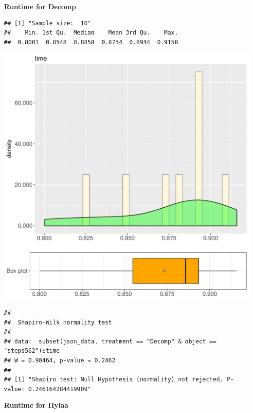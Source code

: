 \documentclass{article}\usepackage[]{graphicx}\usepackage[]{color}
\makeatletter
\def\maxwidth{ %
  \ifdim\Gin@nat@width>\linewidth
    \linewidth
  \else
    \Gin@nat@width
  \fi
}
\newenvironment{kframe}{%
 \def\at@end@of@kframe{}%
 \ifinner\ifhmode%
  \def\at@end@of@kframe{\end{minipage}}%
  \begin{minipage}{\columnwidth}%
 \fi\fi%
 \def\FrameCommand##1{\hskip\@totalleftmargin \hskip-\fboxsep
 \colorbox{shadecolor}{##1}\hskip-\fboxsep
     \hskip-\linewidth \hskip-\@totalleftmargin \hskip\columnwidth}%
 \MakeFramed {\advance\hsize-\width
   \@totalleftmargin\z@ \linewidth\hsize
   \@setminipage}}%
 {\par\unskip\endMakeFramed%
 \at@end@of@kframe}
\newenvironment{knitrout}{}{} %
\makeatother
\begin{document}
 \textbf{Runtime for Decomp}
\begin{knitrout}
\color{fgcolor}\begin{kframe}
\begin{verbatim}
## [1] "Sample size:  10"
##    Min. 1st Qu.  Median    Mean 3rd Qu.    Max. 
##  0.8001  0.8548  0.8858  0.8734  0.8934  0.9158
\end{verbatim}
\end{kframe}
\includegraphics[width=\maxwidth]{figure/RH2_Decomp_steps562-1} 
\begin{kframe}\begin{verbatim}
## 
## 	Shapiro-Wilk normality test
## 
## data:  subset(json_data, treatment == "Decomp" & object == "steps562")$time
## W = 0.90464, p-value = 0.2462
## 
## [1] "Shapiro test: Null Hypothesis (normality) not rejected. P-value: 0.246164284419909"
\end{verbatim}
\end{kframe}
\end{knitrout}
 \textbf{Runtime for Hylaa}
\end{document}
